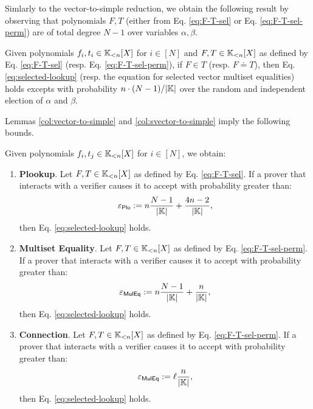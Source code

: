 Simlarly to the vector-to-simple reduction, we obtain the following result by observing that polynomials $F,T$ (either from Eq. \eqref{eq:F-T-sel} or Eq. \eqref{eq:F-T-sel-perm}) are of total degree $N-1$ over variables $\alpha,\beta$.
\begin{lemma}\label{col:svector-to-simple}
  Given polynomials $f_i,t_i \in \mathbb{K}_{<n}[X]$ for $i\in[N]$ and $F,T \in \mathbb{K}_{<n}[X]$ as defined by Eq. \eqref{eq:F-T-sel} (resp. Eq. \eqref{eq:F-T-sel-perm}), if $F \in T$ (resp. $F \doteq T$), then Eq. \eqref{eq:selected-lookup} (resp. the equation for selected vector multiset equalities) holds excepts with probability $n \cdot (N-1)/|\mathbb{K}|$ over the random and independent election of $\alpha$ and $\beta$.
\end{lemma}

Lemmas \ref{col:vector-to-simple} and \ref{col:svector-to-simple} imply the following bounds.
\begin{theorem}\label{thm:sound-bound}
  Given polynomials $f_i,t_j \in \mathbb{K}_{<n}[X]$ for $i\in[N]$, we obtain:
  \begin{enumerate}
    \item \textbf{Plookup}. Let $F,T \in \mathbb{K}_{<n}[X]$ as defined by Eq. \eqref{eq:F-T-sel}. If a prover that interacts with a verifier causes it to accept with probability greater than:
    \[
      \varepsilon_{\textsf{Plo}} := n\frac{N-1}{|\mathbb{K}|} + \frac{4n-2}{|\mathbb{K}|},
    \]
    then Eq. \eqref{eq:selected-lookup} holds.

    \item \textbf{Multiset Equality}. Let $F,T \in \mathbb{K}_{<n}[X]$ as defined by Eq. \eqref{eq:F-T-sel-perm}. If a prover that interacts with a verifier causes it to accept with probability greater than:
    \[
      \varepsilon_{\textsf{MulEq}} := n\frac{N-1}{|\mathbb{K}|} + \frac{n}{|\mathbb{K}|},
    \]
    then Eq. \eqref{eq:selected-lookup} holds.

    \item \textbf{Connection}. Let $F,T \in \mathbb{K}_{<n}[X]$ as defined by Eq. \eqref{eq:F-T-sel-perm}. If a prover that interacts with a verifier causes it to accept with probability greater than:
    \[
      \varepsilon_{\textsf{MulEq}} := \ell\frac{n}{|\mathbb{K}|},
    \]
    then Eq. \eqref{eq:selected-lookup} holds.
  \end{enumerate} 
\end{theorem}


